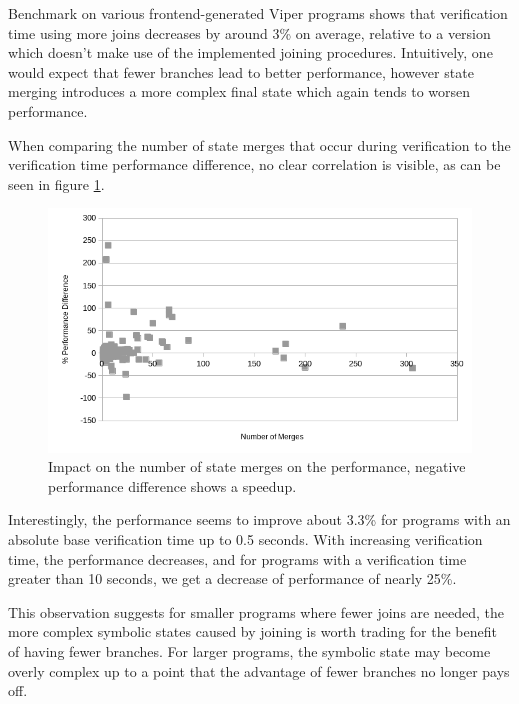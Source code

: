 \documentclass[11pt]{article}
\begin{document}
    Benchmark on various frontend-generated Viper programs shows that verification time using more joins
    decreases by around 3\% on average, relative to a version which doesn't make use of the implemented joining procedures.
    Intuitively, one would expect that fewer branches lead to better
    performance, however state merging introduces a more complex final state which again tends to worsen
    performance.
    
    When comparing the number of state merges that occur during verification
    to the verification time performance difference, no clear correlation is
    visible, as can be seen in figure \ref{fig:state-merges}.

    \begin{figure}[H]
        \includegraphics[width=\linewidth]{state-merges-vs-performance.png}
        \caption{
            Impact on the number of state merges on the performance,
            negative performance difference shows a speedup.
        }
        \label{fig:state-merges}
    \end{figure}

    Interestingly, the performance seems to improve about 3.3\% for programs
    with an absolute base verification time up to 0.5 seconds. With increasing verification
    time, the performance decreases, and for programs with a verification time greater
    than 10 seconds, we get a decrease of performance of nearly 25\%.
    
    This observation suggests for smaller programs where fewer joins are needed, the more complex symbolic
    states caused by joining is worth trading for the benefit of having fewer branches. For
    larger programs, the symbolic state may become overly complex up to a point that the advantage of
    fewer branches no longer pays off.
\end{document}

